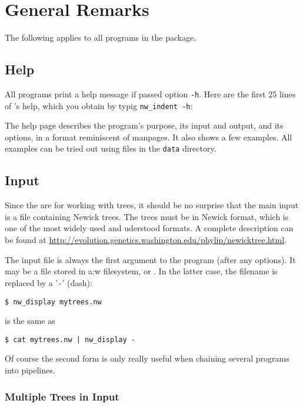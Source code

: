 
\chapter{General Remarks}
\label{chap_general}

The following applies to all programs in the \nutils{} package.

\section{Help}
\label{sct_help}

All programs print a help message if passed option \texttt{-h}. Here are the
first 25 lines of \nwindent{}'s help, which you obtain by typig
\verb+nw_indent -h+:
\begin{samepage}

\end{samepage}
The help page describes the program's purpose, its input and output, and its
options, in a format reminiscent of \unix{} manpages. It also shows a few
examples. All examples can be tried out using files in the \texttt{data}
directory.

\section{Input}
\label{sct_input}

Since the \nutils{} are for working with trees, it should be no surprise
that the main input is a file containing Newick trees. The trees must be in
Newick format, which is one of the most widely used and uderstood formats. A
complete description can be found at
\url{http://evolution.genetics.washington.edu/phylip/newicktree.html}.

The input file is always the first argument to the program (after any options).
It may be a file stored in a:w filesystem, or \stdin{}. In the latter case, the
filename is replaced by a '\texttt{-}' (dash):
\begin{samepage}
\begin{verbatim}
$ nw_display mytrees.nw
\end{verbatim}
is the same as
\begin{verbatim}
$ cat mytrees.nw | nw_display -
\end{verbatim}
\end{samepage}
Of course the second form is only really useful when chaining several programs into pipelines.

\subsection{Multiple Trees in Input}


